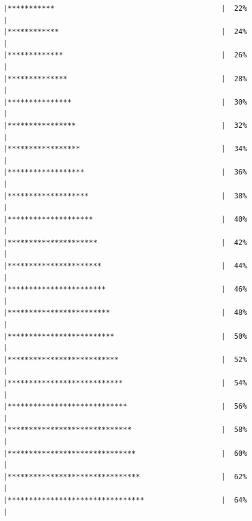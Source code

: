 \documentclass{article}\usepackage[]{graphicx}\usepackage[]{color}
\makeatletter
\newenvironment{kframe}{%
 \def\at@end@of@kframe{}%
 \ifinner\ifhmode%
  \def\at@end@of@kframe{\end{minipage}}%
  \begin{minipage}{\columnwidth}%
 \fi\fi%
 \def\FrameCommand##1{\hskip\@totalleftmargin \hskip-\fboxsep
 \colorbox{shadecolor}{##1}\hskip-\fboxsep
     \hskip-\linewidth \hskip-\@totalleftmargin \hskip\columnwidth}%
 \MakeFramed {\advance\hsize-\width
   \@totalleftmargin\z@ \linewidth\hsize
   \@setminipage}}%
 {\par\unskip\endMakeFramed%
 \at@end@of@kframe}
\newenvironment{knitrout}{}{} %
\makeatother
\begin{document}
\begin{knitrout}
\begin{kframe}
\begin{verbatim}
  |***********                                       |  22%
  |                                                        
  |************                                      |  24%
  |                                                        
  |*************                                     |  26%
  |                                                        
  |**************                                    |  28%
  |                                                        
  |***************                                   |  30%
  |                                                        
  |****************                                  |  32%
  |                                                        
  |*****************                                 |  34%
  |                                                        
  |******************                                |  36%
  |                                                        
  |*******************                               |  38%
  |                                                        
  |********************                              |  40%
  |                                                        
  |*********************                             |  42%
  |                                                        
  |**********************                            |  44%
  |                                                        
  |***********************                           |  46%
  |                                                        
  |************************                          |  48%
  |                                                        
  |*************************                         |  50%
  |                                                        
  |**************************                        |  52%
  |                                                        
  |***************************                       |  54%
  |                                                        
  |****************************                      |  56%
  |                                                        
  |*****************************                     |  58%
  |                                                        
  |******************************                    |  60%
  |                                                        
  |*******************************                   |  62%
  |                                                        
  |********************************                  |  64%
  |                                                        

\end{verbatim}
\end{kframe}
\end{knitrout}
\end{document}
